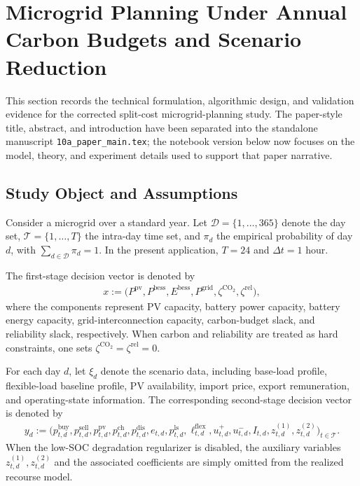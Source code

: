 \section{Microgrid Planning Under Annual Carbon Budgets and Scenario Reduction}

\ifdefined\TenAPaperMode
\else
This section records the technical formulation, algorithmic design, and validation evidence for the corrected split-cost microgrid-planning study. The paper-style title, abstract, and introduction have been separated into the standalone manuscript \texttt{10a\_paper\_main.tex}; the notebook version below now focuses on the model, theory, and experiment details used to support that paper narrative.
\fi

\subsection{Study Object and Assumptions}

Consider a microgrid over a standard year. Let \(\mathcal{D}=\{1,\dots,365\}\) denote the day set, \(\mathcal{T}=\{1,\dots,T\}\) the intra-day time set, and \(\pi_d\) the empirical probability of day \(d\), with \(\sum_{d\in\mathcal{D}} \pi_d = 1\). In the present application, \(T=24\) and \(\Delta t=1\) hour.

The first-stage decision vector is denoted by
\begin{align}
x := \big(P^{\mathrm{pv}}, P^{\mathrm{bess}}, E^{\mathrm{bess}}, P^{\mathrm{grid}}, \zeta^{\mathrm{CO_2}}, \zeta^{\mathrm{rel}}\big),
\end{align}
where the components represent PV capacity, battery power capacity, battery energy capacity, grid-interconnection capacity, carbon-budget slack, and reliability slack, respectively. When carbon and reliability are treated as hard constraints, one sets \(\zeta^{\mathrm{CO_2}}=\zeta^{\mathrm{rel}}=0\).

For each day \(d\), let \(\xi_d\) denote the scenario data, including base-load profile, flexible-load baseline profile, PV availability, import price, export remuneration, and operating-state information. The corresponding second-stage decision vector is denoted by
\begin{align}
y_d := \big(p^{\mathrm{buy}}_{t,d}, p^{\mathrm{sell}}_{t,d}, p^{\mathrm{pv}}_{t,d}, p^{\mathrm{ch}}_{t,d}, p^{\mathrm{dis}}_{t,d}, e_{t,d}, p^{\mathrm{ls}}_{t,d}, \ell^{\mathrm{flex}}_{t,d}, u^+_{t,d}, u^-_{t,d}, I_{t,d}, z^{(1)}_{t,d}, z^{(2)}_{t,d}\big)_{t\in\mathcal{T}}.
\end{align}
When the low-SOC degradation regularizer is disabled, the auxiliary variables \(z^{(1)}_{t,d},z^{(2)}_{t,d}\) and the associated coefficients are simply omitted from the realized recourse model.

